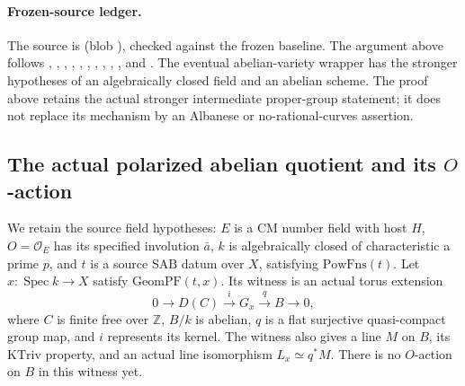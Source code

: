 \paragraph{Frozen-source ledger.}
The source is
\href{https://github.com/ChristianKudeba/alpoge-rh-verification/blob/alpoge-source-7cbf7a0c/src/Development/AbelianVarietyTheory/Proofs/DegenerationProofs/SplitTorusToAbelianVarietyConst.lean}
{}
(blob ),
checked against the frozen baseline.
The argument above follows
, ,
, ,
, ,
, ,
, , and
.
The eventual abelian-variety wrapper has the stronger hypotheses
of an algebraically closed field and an abelian scheme.
The proof above retains the actual stronger intermediate
proper-group statement; it does not replace its mechanism by
an Albanese or no-rational-curves assertion.


\subsection{The actual polarized abelian quotient and its \(O\)-action}
\label{subsec:faithful-actual-abelian-quotient}

We retain the source field hypotheses: \(E\) is a CM number
field with host \(H\), \(O=\mathcal O_E\) has its specified
involution \(\bar a\), \(k\) is algebraically closed of
characteristic a prime \(p\), and \(t\) is a source
\(\mathrm{SAB}\) datum over \(X\), satisfying
\(\mathrm{PowFns}(t)\).
Let \(x:\operatorname{Spec}k\to X\) satisfy
\(\mathrm{GeomPF}(t,x)\).
Its witness is an actual torus extension
\[
       0\longrightarrow D(C)\stackrel i\longrightarrow G_x
                       \stackrel q\longrightarrow B\longrightarrow0,
 \tag{AQ1}\label{eq:faithful-geometric-quotient-extension}
\]
where \(C\) is finite free over \(\mathbb Z\), \(B/k\) is
abelian, \(q\) is a flat surjective quasi-compact group map,
and \(i\) represents its kernel.  The witness also gives a
line \(M\) on \(B\), its \(\mathrm{KTriv}\) property, and an
actual line isomorphism \(L_x\simeq q^*M\).
There is no \(O\)-action on \(B\) in this witness yet.

